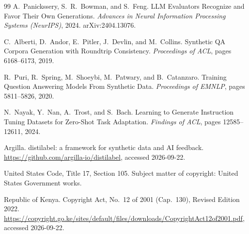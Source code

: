 \documentclass[11pt]{article}
\begin{document}
\begin{thebibliography}{99}
A.~Panickssery, S.~R.~Bowman, and S.~Feng.
\newblock LLM Evaluators Recognize and Favor Their Own Generations.
\newblock \emph{Advances in Neural Information Processing Systems (NeurIPS)}, 2024.
\newblock arXiv:2404.13076.

C.~Alberti, D.~Andor, E.~Pitler, J.~Devlin, and M.~Collins.
\newblock Synthetic QA Corpora Generation with Roundtrip Consistency.
\newblock \emph{Proceedings of ACL}, pages 6168--6173, 2019.

R.~Puri, R.~Spring, M.~Shoeybi, M.~Patwary, and B.~Catanzaro.
\newblock Training Question Answering Models From Synthetic Data.
\newblock \emph{Proceedings of EMNLP}, pages 5811--5826, 2020.

N.~Nayak, Y.~Nan, A.~Trost, and S.~Bach.
\newblock Learning to Generate Instruction Tuning Datasets for Zero-Shot Task Adaptation.
\newblock \emph{Findings of ACL}, pages 12585--12611, 2024.

Argilla.
\newblock distilabel: a framework for synthetic data and AI feedback.
\newblock \url{https://github.com/argilla-io/distilabel}, accessed 2026-09-22.

United States Code, Title 17, Section 105.
\newblock Subject matter of copyright: United States Government works.

Republic of Kenya.
\newblock Copyright Act, No.~12 of 2001 (Cap.~130), Revised Edition 2022.
\newblock \url{https://copyright.go.ke/sites/default/files/downloads/CopyrightAct12of2001.pdf}, accessed 2026-09-22.

\end{thebibliography}
\end{document}
